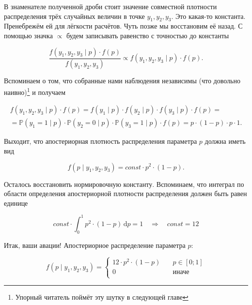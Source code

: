 \documentclass[12pt, a4paper, oneside]{extreport}
\def \mbb{\mathbb}
\def \PP{\mbb{P}}
\newcommand{\dx}[1]{\,\mathrm{d}#1} %
\theoremstyle{plain}              %
\theoremstyle{definition}         %
\begin{document}
В знаменателе полученной дроби стоит значение совместной плотности распределения трёх случайных величин в точке $y_1, y_2, y_3$. Это какая-то константа. Пренебрежём ей для лёгкости расчётов. Чуть позже мы восстановим её назад. С помощью значка $\propto$ будем записывать равенство с точностью до константы

\[  \frac{f(y_1,y_2,y_3 \mid p) \cdot f(p)}{f(y_1,y_2,y_3)} \propto f(y_1,y_2,y_3 \mid p) \cdot f(p).\]

Вспоминаем о том, что собранные нами наблюдения независимы (что довольно наивно)\footnote{Упорный читатель поймёт эту шутку в следующей главе} и получаем

\begin{multline*}
f(y_1,y_2,y_3 \mid p) \cdot f(p) =  f(y_1 \mid p) \cdot f(y_2 \mid p) \cdot f(y_3 \mid p) \cdot f(p) = \\ = \PP(y_1 = 1 \mid p) \cdot \PP(y_2 = 0 \mid p) \cdot \PP(y_3 = 1 \mid p) \cdot f(p) = p \cdot (1 - p) \cdot p \cdot 1.
\end{multline*}

Выходит, что апостериорная плотность распределения параметра $p$ должна иметь вид

\[ f(p \mid y_1, y_2, y_3) = const \cdot p^2 \cdot (1-p).\]

Осталось восстановить нормировочную константу. Вспоминаем, что интеграл по области определения апостериорной плотности распределения должен быть равен единице


\[ const \cdot \int_0^1 p^2 \cdot (1-p) \dx{p}  = 1 \quad \Rightarrow \quad const = 12 \]

Итак, ваши авации! Апостериорное распределение параметра $p$:


\[ f(p \mid y_1, y_2, y_3) =
  \begin{cases}
    12 \cdot p^2 \cdot (1-p)   & \quad p \in [0;1] \\
    0      & \quad \text{иначе}\\
  \end{cases}
\]
\end{document}
